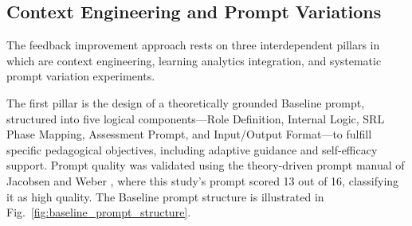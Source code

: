 \documentclass[conference,a4paper]{IEEEtran}
\begin{document}

%
%
%
%


\subsection{Context Engineering and Prompt Variations}
\label{sec:method}

The feedback improvement approach rests on three 
interdependent pillars in which are context engineering, 
learning analytics integration, and systematic 
prompt variation experiments.

The first pillar is the design of a theoretically 
grounded Baseline prompt, structured into 
five logical components—Role Definition, Internal 
Logic, SRL Phase Mapping, Assessment Prompt, and 
Input/Output Format—to fulfill specific pedagogical 
objectives, including adaptive guidance and 
self-efficacy support. Prompt quality was validated 
using the theory-driven prompt manual of Jacobsen 
and Weber \cite{jacobsen2025promises}, where this 
study's prompt scored 13 out of 16, classifying it 
as high quality. The Baseline prompt structure is 
illustrated in Fig.~\ref{fig:baseline_prompt_structure}.
\end{document}
